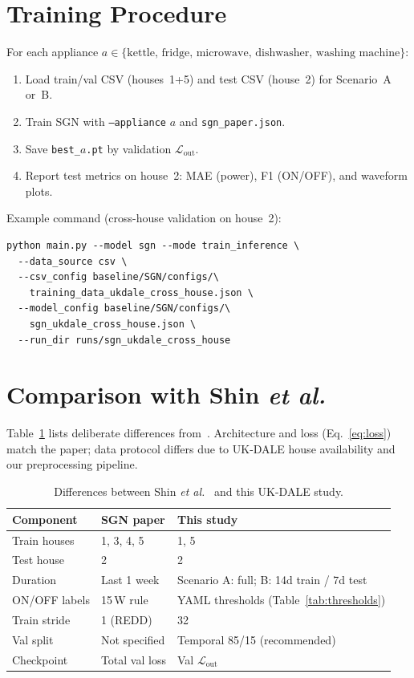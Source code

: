 \documentclass[conference]{IEEEtran}
\begin{document}
\section{Training Procedure}
For each appliance $a \in \{\text{kettle, fridge, microwave, dishwasher, washing machine}\}$:
\begin{enumerate}
\item Load train/val CSV (houses~1+5) and test CSV (house~2) for Scenario~A or~B.
\item Train SGN with \texttt{--appliance} $a$ and \texttt{sgn\_paper.json}.
\item Save \texttt{best\_}$a$\texttt{.pt} by validation $\mathcal{L}_{\mathrm{out}}$.
\item Report test metrics on house~2: MAE (power), F1 (ON/OFF), and waveform plots.
\end{enumerate}

Example command (cross-house validation on house~2):
\begin{verbatim}
python main.py --model sgn --mode train_inference \
  --data_source csv \
  --csv_config baseline/SGN/configs/\
    training_data_ukdale_cross_house.json \
  --model_config baseline/SGN/configs/\
    sgn_ukdale_cross_house.json \
  --run_dir runs/sgn_ukdale_cross_house
\end{verbatim}

\section{Comparison with Shin \textit{et al.}}
Table~\ref{tab:paperdiff} lists deliberate differences from~\cite{shin2019sgn}.
Architecture and loss (Eq.~\eqref{eq:loss}) match the paper; data protocol differs due to UK-DALE house availability and our preprocessing pipeline.

\begin{table}[htbp]
\caption{Differences between Shin \textit{et al.}~\cite{shin2019sgn} and this UK-DALE study.}
\label{tab:paperdiff}
\centering
\small
\begin{tabular}{@{}p{2.2cm}p{2.3cm}p{2.3cm}@{}}
\toprule
\textbf{Component} & \textbf{SGN paper} & \textbf{This study} \\
\midrule
Train houses & 1, 3, 4, 5 & 1, 5 \\
Test house & 2 & 2 \\
Duration & Last 1 week & Scenario A: full; B: 14d train / 7d test \\
ON/OFF labels & 15\,W rule & YAML thresholds (Table~\ref{tab:thresholds}) \\
Train stride & 1 (REDD) & 32 \\
Val split & Not specified & Temporal 85/15 (recommended) \\
Checkpoint & Total val loss & Val $\mathcal{L}_{\mathrm{out}}$ \\
\bottomrule
\end{tabular}
\end{table}
\end{document}

